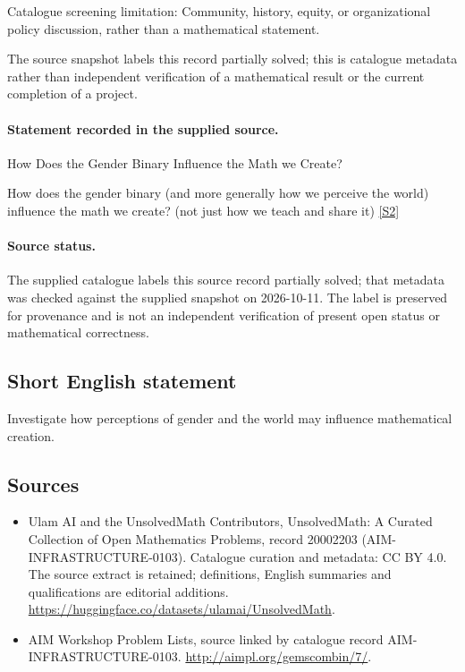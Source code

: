 \documentclass[11pt]{article}
\begin{document}
Catalogue screening limitation: Community, history, equity, or organizational policy discussion, rather than a mathematical statement.

The source snapshot labels this record partially solved; this is catalogue metadata rather than independent verification of a mathematical result or the current completion of a project.
\paragraph{Statement recorded in the supplied source.}
How Does the Gender Binary Influence the Math we Create?

How does the gender binary (and more generally how we perceive the world) influence the math we create? (not just how we teach and share it) \href{http://aimpl.org/gemscombin/7/}{[S2]}
\paragraph{Source status.}
The supplied catalogue labels this source record partially solved; that metadata was checked against the supplied snapshot on 2026-10-11. The label is preserved for provenance and is not an independent verification of present open status or mathematical correctness.
\subsection{Short English statement}
Investigate how perceptions of gender and the world may influence mathematical creation.
\subsection{Sources}
\begin{itemize}
\item[S1] Ulam AI and the UnsolvedMath Contributors, UnsolvedMath: A Curated Collection of Open Mathematics Problems, record 20002203 (AIM-INFRASTRUCTURE-0103). Catalogue curation and metadata: CC BY 4.0. The source extract is retained; definitions, English summaries and qualifications are editorial additions.
\url{https://huggingface.co/datasets/ulamai/UnsolvedMath}.
\item[S2] AIM Workshop Problem Lists, source linked by catalogue record AIM-INFRASTRUCTURE-0103.
\url{http://aimpl.org/gemscombin/7/}.
\end{itemize}
\end{document}
